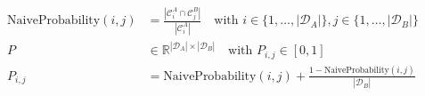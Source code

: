 \begin{equation}
    \begin{aligned}
        \text{NaiveProbability}(i, j) & = \frac{|\mathcal{C}_i^A \cap \mathcal{C}_j^B|}{|\mathcal{C}_i^A|} \quad \text{with } i \in \{1, \ldots, |\mathcal{D}_A|\}, j \in \{1, \ldots, |\mathcal{D}_B|\} \\
        P                             & \in \mathds{R}^{|\mathcal{D}_A| \times |\mathcal{D}_B|} \quad \text{with } P_{i,j} \in [0, 1]                                                                    \\
        P_{i,j}                       & = \text{NaiveProbability}(i, j) + \frac{1 - \text{NaiveProbability}(i, j)}{|\mathcal{D}_B|}
    \end{aligned}
\end{equation}
